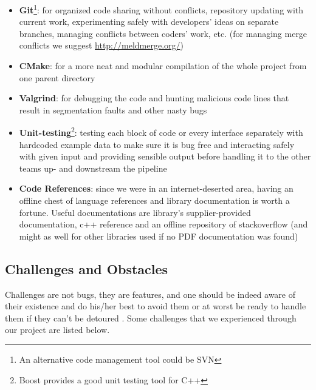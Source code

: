 \begin{itemize}
  \item \textbf{Git}\footnote{An alternative code management tool could be SVN}: for organized code sharing without conflicts, repository updating with current work, experimenting safely with developers' ideas on separate branches, managing conflicts between coders' work, etc. (for managing merge conflicts we suggest \href{meld}{http://meldmerge.org/})
  \item \textbf{CMake}: for a more neat and modular compilation of the whole project from one parent directory
  \item \textbf{Valgrind}: for debugging the code and hunting malicious code lines that result in segmentation faults and other nasty bugs
  \item \textbf{Unit-testing}\footnote{Boost provides a good unit testing tool for C++}: testing each block of code or every interface separately with hardcoded example data to make sure it is bug free and interacting safely with given input and providing sensible output before handling it to the other teams up- and downstream the pipeline\label{unit_testing}
  \item \textbf{Code References}: since we were in an internet-deserted area, having an offline chest of language references and library documentation is worth a fortune. Useful documentations are library's supplier-provided documentation, c++ reference and an offline repository of stackoverflow (and might as well for other libraries used if no PDF documentation was found)
\end{itemize}

\subsection{Challenges and Obstacles}
Challenges are not bugs, they are features, and one should be indeed aware of their existence and do his/her best to avoid them or at worst be ready to handle them if they can't be detoured . Some challenges that we experienced through our project are listed below.

